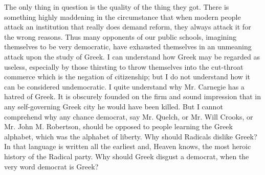 \documentclass{book}
\begin{document}
The only thing in question is the quality of the thing they got. There is something highly maddening in the circumstance that when modern people attack an institution that really does demand reform, they always attack it for the wrong reasons. Thus many opponents of our public schools, imagining themselves to be very democratic, have exhausted themselves in an unmeaning attack upon the study of Greek. I can understand how Greek may be regarded as useless, especially by those thirsting to throw themselves into the cut-throat commerce which is the negation of citizenship; but I do not understand how it can be considered undemocratic. I quite understand why Mr. Carnegie has a hatred of Greek. It is obscurely founded on the firm and sound impression that in any self-governing Greek city he would have been killed. But I cannot comprehend why any chance democrat, say Mr. Quelch, or Mr. Will Crooks, or Mr. John M. Robertson, should be opposed to people learning the Greek alphabet, which was the alphabet of liberty. Why should Radicals dislike Greek? In that language is written all the earliest and, Heaven knows, the most heroic history of the Radical party. Why should Greek disgust a democrat, when the very word democrat is Greek?
\end{document}
